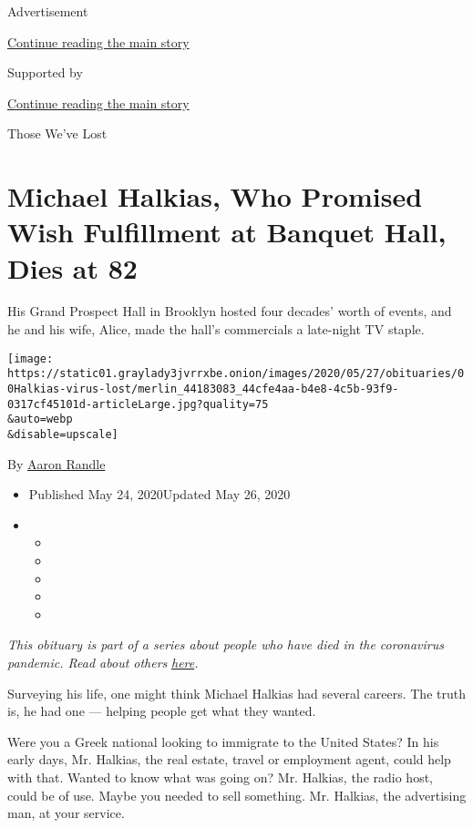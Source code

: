 Advertisement

\protect\hyperlink{after-top}{Continue reading the main story}

Supported by

\protect\hyperlink{after-sponsor}{Continue reading the main story}

Those We've Lost

\hypertarget{michael-halkias-who-promised-wish-fulfillment-at-banquet-hall-dies-at-82}{%
\section{Michael Halkias, Who Promised Wish Fulfillment at Banquet Hall,
Dies at
82}\label{michael-halkias-who-promised-wish-fulfillment-at-banquet-hall-dies-at-82}}

His Grand Prospect Hall in Brooklyn hosted four decades' worth of
events, and he and his wife, Alice, made the hall's commercials a
late-night TV staple.

\texttt{[image: https://static01.graylady3jvrrxbe.onion/images/2020/05/27/obituaries/00Halkias-virus-lost/merlin\_44183083\_44cfe4aa-b4e8-4c5b-93f9-0317cf45101d-articleLarge.jpg?quality=75\\\&auto=webp\\\&disable=upscale]}

By \href{https://www.nytimes3xbfgragh.onion/by/aaron-randle}{Aaron
Randle}

\begin{itemize}
\item
  Published May 24, 2020Updated May 26, 2020
\item
  \begin{itemize}
  \item
  \item
  \item
  \item
  \item
  \end{itemize}
\end{itemize}

\emph{This obituary is part of a series about people who have died in
the coronavirus pandemic. Read about others}
\href{https://www.nytimes3xbfgragh.onion/series/people-who-have-died-of-the-coronavirus}{\emph{here}}\emph{.}

Surveying his life, one might think Michael Halkias had several careers.
The truth is, he had one --- helping people get what they wanted.

Were you a Greek national looking to immigrate to the United States? In
his early days, Mr. Halkias, the real estate, travel or employment
agent, could help with that. Wanted to know what was going on? Mr.
Halkias, the radio host, could be of use. Maybe you needed to sell
something. Mr. Halkias, the advertising man, at your service.

